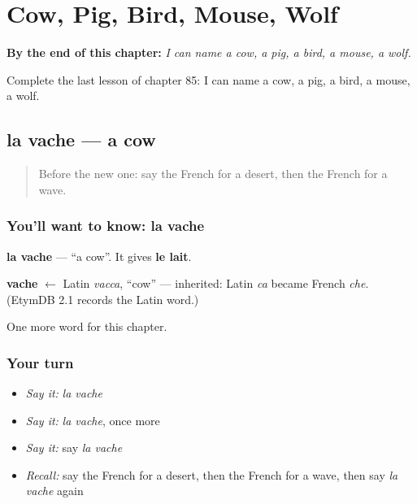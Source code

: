 
\chapter{Cow, Pig, Bird, Mouse, Wolf}
\label{ch:fr-cow-pig-bird-mouse-wolf}

\begin{chapteropening}
\textbf{By the end of this chapter:} \emph{I can name a cow, a pig, a bird, a mouse, a wolf.}

Complete the last lesson of chapter 85: I can name a cow, a pig, a bird, a mouse, a wolf.
\end{chapteropening}

\section[la vache]{la vache — a cow}

\label{lesson:FR-C85-vache}



\begin{quote}
Before the new one: say the French for a desert, then the French for a wave.
\end{quote}

\subsection*{You'll want to know: la vache}
\textbf{la vache} — \textquotedblleft{}a cow\textquotedblright{}. It gives \textbf{le lait}.

\begin{cousinweb}
\textbf{vache} $\leftarrow$ Latin \emph{vacca}, \textquotedblleft{}cow\textquotedblright{} — inherited: Latin \emph{ca} became French \emph{che}. (EtymDB 2.1 records the Latin word.)
\end{cousinweb}

\begin{grammarlens}[title={What you've built}]
One more word for this chapter.
\end{grammarlens}

\subsection*{Your turn}
\begin{itemize}
\raggedright
  \item \emph{Say it:} \emph{la vache}
  \item \emph{Say it:} \emph{la vache}, once more
  \item \emph{Say it:} say \emph{la vache}
  \item \emph{Recall:} say the French for a desert, then the French for a wave, then say \emph{la vache} again
\end{itemize}

